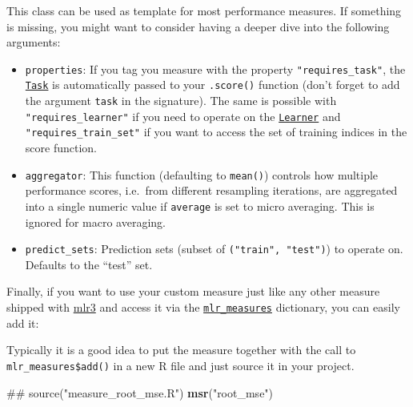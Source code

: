 \documentclass[]{scrbook}
\newenvironment{Shaded}{\begin{snugshade}}{\end{snugshade}}
\newcommand{\KeywordTok}[1]{\textcolor[rgb]{0.13,0.29,0.53}{\textbf{#1}}}
\newcommand{\NormalTok}[1]{#1}
\newcommand{\OperatorTok}[1]{\textcolor[rgb]{0.81,0.36,0.00}{\textbf{#1}}}
\newcommand{\StringTok}[1]{\textcolor[rgb]{0.31,0.60,0.02}{#1}}
\providecommand{\tightlist}{%
  \setlength{\itemsep}{0pt}\setlength{\parskip}{0pt}}
\renewenvironment{Shaded} {\begin{snugshade}\small} {\end{snugshade}}
\begin{document}
This class can be used as template for most performance measures.
If something is missing, you might want to consider having a deeper dive into the following arguments:

\begin{itemize}
\tightlist
\item
  \texttt{properties}: If you tag you measure with the property \texttt{"requires\_task"}, the \href{https://mlr3.mlr-org.com/reference/Task.html}{\texttt{Task}} is automatically passed to your \texttt{.score()} function (don't forget to add the argument \texttt{task} in the signature).
  The same is possible with \texttt{"requires\_learner"} if you need to operate on the \href{https://mlr3.mlr-org.com/reference/Learner.html}{\texttt{Learner}} and \texttt{"requires\_train\_set"} if you want to access the set of training indices in the score function.
\item
  \texttt{aggregator}: This function (defaulting to \texttt{mean()}) controls how multiple performance scores, i.e.~from different resampling iterations, are aggregated into a single numeric value if \texttt{average} is set to micro averaging.
  This is ignored for macro averaging.
\item
  \texttt{predict\_sets}: Prediction sets (subset of \texttt{("train",\ "test")}) to operate on.
  Defaults to the ``test'' set.
\end{itemize}

Finally, if you want to use your custom measure just like any other measure shipped with \href{https://mlr3.mlr-org.com}{mlr3} and access it via the \href{https://mlr3.mlr-org.com/reference/mlr_measures.html}{\texttt{mlr\_measures}} dictionary, you can easily add it:

\begin{Shaded}
\end{Shaded}

Typically it is a good idea to put the measure together with the call to \texttt{mlr\_measures\$add()} in a new R file and just source it in your project.

\begin{Shaded}
\begin{Highlighting}[]
\NormalTok{## source("measure_root_mse.R")}
\KeywordTok{msr}\NormalTok{(}\StringTok{"root_mse"}\NormalTok{)}
\end{Highlighting}
\end{Shaded}
\end{document}
